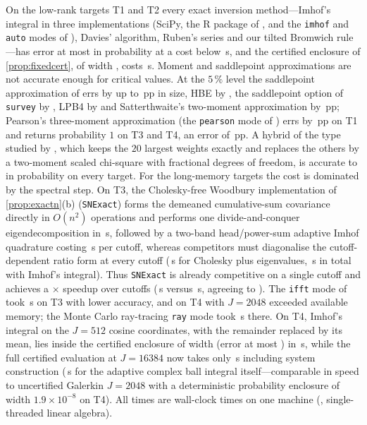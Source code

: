 On the low-rank targets T1 and T2 every exact inversion method---Imhof's integral in
three implementations (SciPy, the R package of \citet{DL10}, and the \texttt{imhof} and \texttt{auto} modes of
\citet{Das25}), Davies' algorithm, Ruben's series and our tilted Bromwich rule---has error at most
 in probability at a cost below \,s, and the certified enclosure of
\cref{prop:fixedcert}, of width , costs \,s. Moment and
saddlepoint approximations are not accurate enough for critical values. At the $5\,\%$ level the saddlepoint
approximation of \citet{Kuo99} errs by up to \,pp in size, HBE by , the
saddlepoint option of \texttt{survey} by , LPB4 by  and
Satterthwaite's two-moment approximation by \,pp; Pearson's three-moment approximation (the
\texttt{pearson} mode of \citet{Das25}) errs by \,pp on T1 and returns probability $1$ on T3 and
T4, an error of \,pp. A hybrid of the type studied by \citet{CL19}, which keeps the $20$
largest weights exactly and replaces the others by a two-moment scaled chi-square with fractional degrees of freedom, is
accurate to  in probability on every target. For the long-memory targets the cost is
dominated by the spectral step. On T3, the Cholesky-free Woodbury implementation of \cref{prop:exactn}(b)
(\texttt{SNExact}) forms the demeaned cumulative-sum covariance directly in $O(n^2)$ operations and performs one
divide-and-conquer eigendecomposition in \,s, followed by a two-band head/power-sum adaptive
Imhof quadrature costing \,s per cutoff, whereas competitors must diagonalise the cutoff-dependent
ratio form at every cutoff (\,s for Cholesky plus eigenvalues, \,s in total
with Imhof's integral). Thus \texttt{SNExact} is already competitive on a single cutoff and achieves a
$\times$ speedup over  cutoffs (\,s versus
\,s, agreeing to ). The \texttt{ifft} mode of \citet{Das25} took
\,s on T3 with lower accuracy, and on T4 with $J=2048$ exceeded available memory; the Monte Carlo
ray-tracing \texttt{ray} mode took \,s there. On T4, Imhof's integral on the $J=512$ cosine
coordinates, with the remainder replaced by its mean, lies inside the certified enclosure of width
 (error at most ) in \,s, while the full
certified \CosCert{} evaluation at $J=16384$ now takes only \,s including system construction
(\,s for the adaptive complex ball integral itself---comparable in speed to uncertified
Galerkin $J=2048$ with a deterministic probability enclosure of width $1.9\times10^{-8}$ on T4). All times are wall-clock times on one machine
(, single-threaded linear algebra).

